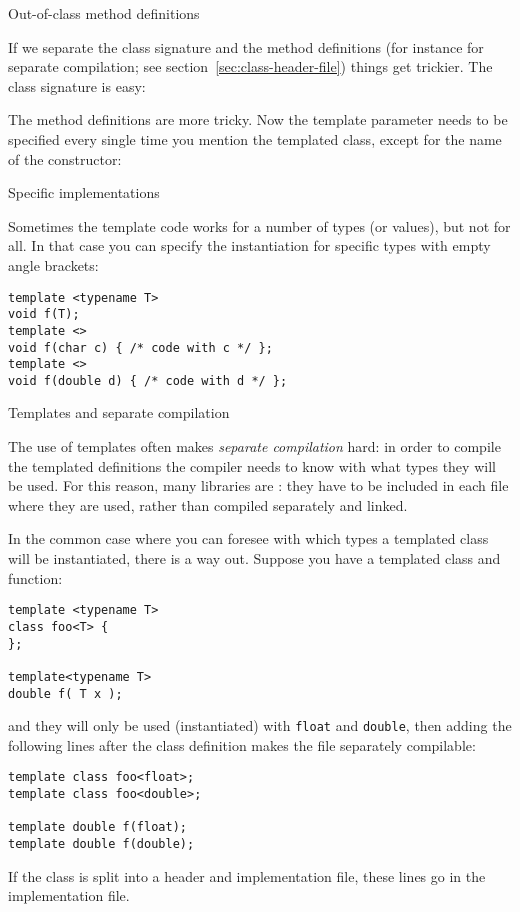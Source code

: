  {Out-of-class method definitions}

If we separate the class signature and the method definitions
(for instance for separate compilation; see section~\ref{sec:class-header-file})
things get trickier.
The class signature is easy:
%

The method definitions are more tricky.
Now the template parameter needs to be specified every single time
you mention the templated class,
except for the name of the constructor:
%

 {Specific implementations}

Sometimes the template code works for a number of types (or values),
but not for all. In that case you can specify the instantiation for
specific types with empty angle brackets:
\begin{lstlisting}
template <typename T>
void f(T);
template <> 
void f(char c) { /* code with c */ };
template <>
void f(double d) { /* code with d */ };
\end{lstlisting}

 {Templates and separate compilation}
\label{sec:templ-header}

The use of templates often makes
\emph{separate compilation}
hard: in order to compile the
templated definitions the compiler needs to know with what types they
will be used.
For this reason, many libraries are :
they have to be included in each file where they are used,
rather than compiled separately and linked.

In the common case where you can foresee with which types
a templated class will be instantiated, there is a way out.
Suppose you have a templated class and function:
\begin{lstlisting}
template <typename T>
class foo<T> {
};

template<typename T>
double f( T x );
\end{lstlisting}
and they will only be used (instantiated) with \lstinline{float} and
\lstinline{double}, then adding the following lines after the class definition
makes the file separately compilable:
\begin{lstlisting}
template class foo<float>;
template class foo<double>;

template double f(float);
template double f(double);
\end{lstlisting}

If the class is split into a header and implementation file,
these lines go in the implementation file.


